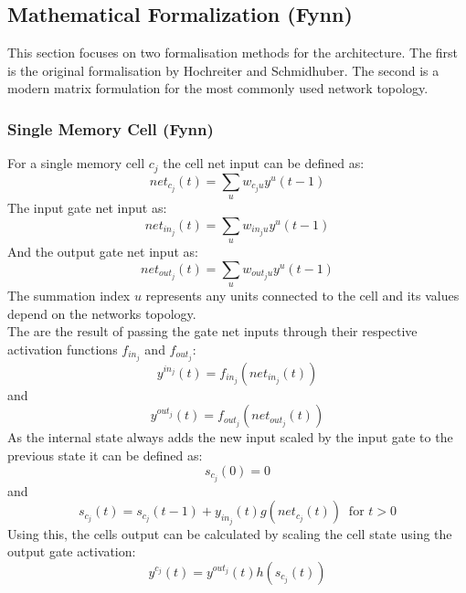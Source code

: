 \documentclass[twoside,a4paper,10pt,DIV=12,BCOR=12mm]{scrartcl}
\begin{document}
\subsection{Mathematical Formalization (Fynn)}

This section focuses on two formalisation methods for the architecture. The first is the original formalisation by Hochreiter and Schmidhuber. The second is a modern matrix formulation for the most commonly used network topology.

\subsubsection{Single Memory Cell (Fynn)}
For a single memory cell $c_j$ the cell net input can be defined as:\cite{hochreiter1997lstm}
$$net_{c_j}(t)=\sum_u w_{c_ju}y^u (t-1)$$
The input gate net input as:\cite{hochreiter1997lstm}
$$net_{in_j}(t)=\sum_u w_{in_j u}y^u(t-1)$$
And the output gate net input as:\cite{hochreiter1997lstm}
$$net_{out_j}(t)=\sum_uw_{out_j u}y^u(t-1)$$
The summation index $u$ represents any units connected to the cell and its values depend on the networks topology.\cite{hochreiter1997lstm} \\
The are the result of passing the gate net inputs through their respective activation functions $f_{in_j}$ and $f_{out_j}$:\cite{hochreiter1991}
$$y^{in_j}(t)=f_{in_j}\left(net_{in_j}(t)\right)$$
and
$$y^{out_j}(t)=f_{out_j}\left(net_{out_j}(t)\right)$$
As the internal state always adds the new input scaled by the input gate to the previous state it can be defined as:\cite{hochreiter1997lstm}
$$s_{c_j}(0)=0$$
and
$$s_{c_j}(t)=s_{c_j}(t-1)+y_{in_j}(t)g\left(net_{c_j}(t)\right)\ \text{ for } t>0$$
Using this, the cells output can be calculated by scaling the cell state using the output gate activation:\cite{hochreiter1997lstm}
$$y^{c_j}(t)=y^{out_j}(t)h\left(s_{c_j}(t)\right)$$
\end{document}
